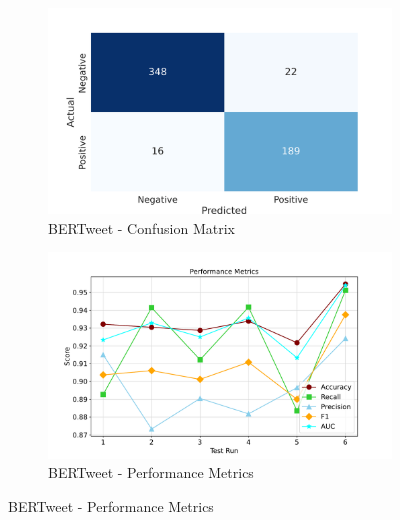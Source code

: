 \begin{figure}[!ht]
    \small
    \centering
    \begin{subfigure}{0.45\linewidth}
        \includegraphics[width=\linewidth]{figures/confusion_bertweet.png}
        \caption{BERTweet - Confusion Matrix}
    \end{subfigure}
    \hfil
    \begin{subfigure}{0.45\linewidth}
        \includegraphics[width=\linewidth]{figures/metrics_line_bertweet.pdf}
        \caption{BERTweet - Performance Metrics}
    \end{subfigure}


\end{figure}
